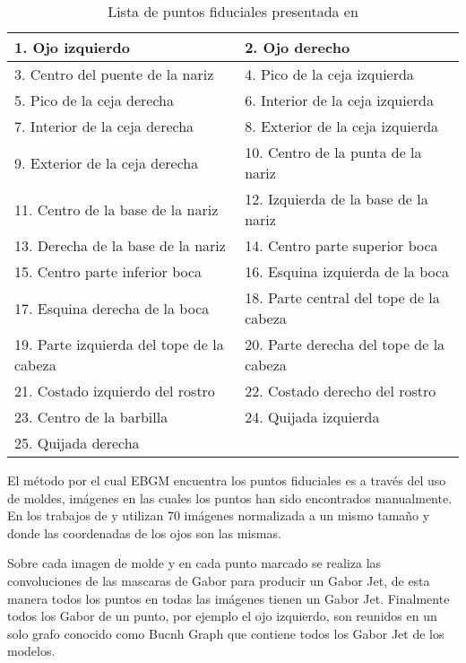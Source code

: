 \begin{table}[h]
\centering
\caption{Lista de puntos fiduciales presentada en \cite{bolme2003elastic}}
\label{ta:PuntosFiduciales}
\begin{tabular}{|l|l|}
\hline
1. Ojo izquierdo                          & 2. Ojo derecho                          \\ \hline
3. Centro del puente de la nariz          & 4. Pico de la ceja izquierda            \\ \hline
5. Pico de la ceja derecha                & 6. Interior de la ceja izquierda        \\ \hline
7. Interior de la ceja derecha            & 8. Exterior de la ceja izquierda        \\ \hline
9. Exterior de la ceja derecha            & 10. Centro de la punta de la nariz      \\ \hline
11. Centro de la base de la nariz         & 12. Izquierda de la base de la nariz    \\ \hline
13. Derecha de la base de la nariz        & 14. Centro parte superior boca          \\ \hline
15. Centro parte inferior boca            & 16. Esquina izquierda de la boca        \\ \hline
17. Esquina derecha de la boca            & 18. Parte central del tope de la cabeza \\ \hline
19. Parte izquierda del tope de la cabeza & 20. Parte derecha del tope de la cabeza \\ \hline
21. Costado izquierdo del rostro          & 22. Costado derecho del rostro          \\ \hline
23. Centro de la barbilla                 & 24. Quijada izquierda                   \\ \hline
25. Quijada derecha                       &                                         \\ \hline
\end{tabular}
\end{table}

El método por el cual \ac{EBGM} encuentra los puntos fiduciales es a través del uso de moldes, imágenes en  las cuales los puntos han sido encontrados manualmente. En los trabajos de \cite{wiskott1997face} y \cite{bolme2003elastic} utilizan 70 imágenes normalizada a un mismo tamaño y donde las coordenadas de los ojos son las mismas.

Sobre cada imagen de molde y en cada punto marcado se realiza las convoluciones de las mascaras de Gabor para producir un Gabor Jet, de esta manera todos los puntos en todas las imágenes tienen un Gabor Jet. Finalmente todos los Gabor de un punto, por ejemplo el ojo izquierdo, son reunidos en un solo grafo conocido como Bucnh Graph que contiene todos los Gabor Jet de los modelos.

